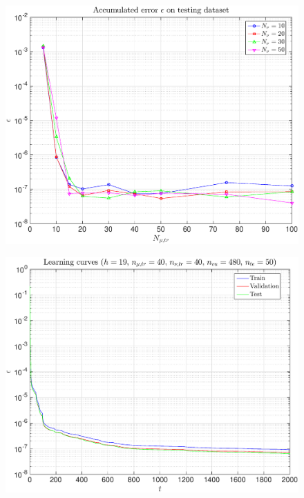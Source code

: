 \documentclass[11pt,a4paper]{article}
\theoremstyle{definition}
\theoremstyle{theorem}
\numberwithin{equation}{section}
\begin{document}
	\begin{figure}[H]
		\center
		\includegraphics[scale = 0.5]{fig11}
		\caption{}
	\end{figure}
	
	\begin{figure}[H]
		\center
		\includegraphics[scale = 0.5]{fig12}
		\caption{}
	\end{figure}
	
\end{document}
